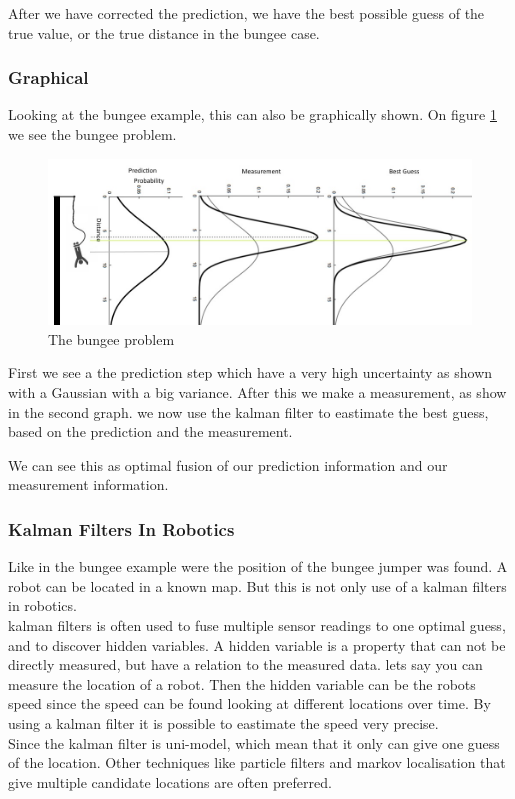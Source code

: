 After we have corrected the prediction, we have the best possible guess of the true value, or the true distance in the bungee case. 

\subsubsection{Graphical}
Looking at the bungee example, this can also be graphically shown. On figure \ref{bungeeFig} we see the bungee problem. 

\begin{figure}[H]
\includegraphics[scale=0.60]{billeder/Bungee.jpg}
\caption{The bungee problem}
\label{bungeeFig}
\end{figure}

First we see a the prediction step which have a very high uncertainty as shown with a Gaussian with a big variance. After this we make a measurement, as show in the second graph. we now use the kalman filter to eastimate the best guess, based on the prediction and the measurement. 

We can see this as optimal fusion of our prediction information and our measurement information. 

\subsubsection{Kalman Filters In Robotics}
Like in the bungee example were the position of the bungee jumper was found. A robot can be located in a known map. But this is not only use of a kalman filters in robotics. \\
kalman filters is often used to fuse multiple sensor readings to one optimal guess, and to discover hidden variables. A hidden variable is a property that can not be directly measured, but have a relation to the measured data. lets say you can measure the location of a robot. Then the hidden variable can be the robots speed since the speed can be found looking at different locations over time. By using a kalman filter it is possible to eastimate the speed very precise. \\
Since the kalman filter is uni-model, which mean that it only can give one guess of the location. Other techniques like particle filters and markov localisation that give multiple candidate locations are often preferred. 

